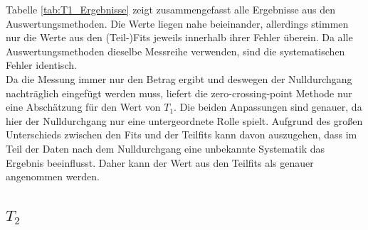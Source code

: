 \documentclass[12pt,a4paper]{article}
\begin{document}
Tabelle \ref{tab:T1_Ergebnisse} zeigt zusammengefasst alle Ergebnisse aus den Auswertungsmethoden. Die Werte liegen nahe beieinander, allerdings stimmen nur die Werte aus den (Teil-)Fits jeweils innerhalb ihrer Fehler überein. Da alle Auswertungsmethoden dieselbe Messreihe verwenden, sind die systematischen Fehler identisch.\\
Da die Messung immer nur den Betrag ergibt und deswegen der Nulldurchgang nachträglich eingefügt werden muss, liefert die zero-crossing-point Methode nur eine Abschätzung für den Wert von $T_1$. Die beiden Anpassungen sind genauer, da hier der Nulldurchgang nur eine untergeordnete Rolle spielt. Aufgrund des großen Unterschieds zwischen den Fits und der Teilfits kann davon auszugehen, dass im Teil der Daten nach dem Nulldurchgang eine unbekannte Systematik das Ergebnis beeinflusst. Daher kann der Wert aus den Teilfits als genauer angenommen werden.


\subsection{$T_2$}
\end{document}
